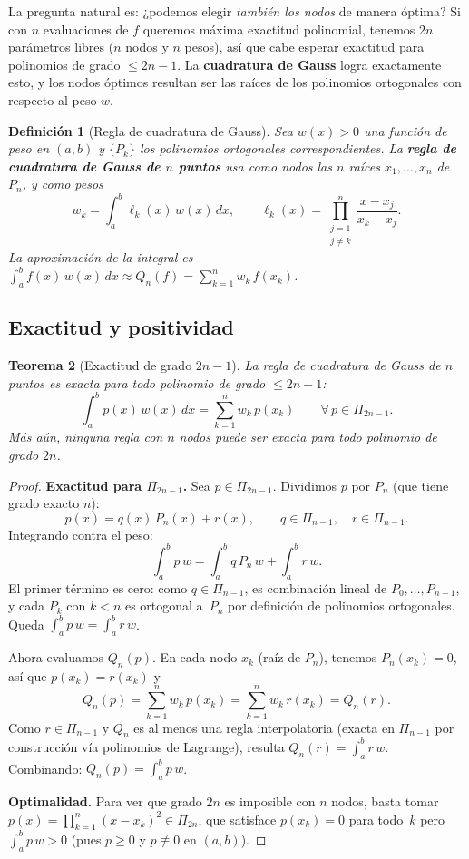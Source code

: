 \documentclass[a4paper,11pt]{report}
\newtheorem{theorem}{Teorema}[chapter]
\newtheorem{definition}[theorem]{Definición}
\begin{document}
La pregunta natural es: ¿podemos elegir \emph{también los nodos} de manera óptima?  Si con $n$ evaluaciones de $f$ queremos máxima exactitud polinomial, tenemos $2n$ parámetros libres ($n$ nodos y $n$ pesos), así que cabe esperar exactitud para polinomios de grado $\leq 2n - 1$.  La \textbf{cuadratura de Gauss} logra exactamente esto, y los nodos óptimos resultan ser las raíces de los polinomios ortogonales con respecto al peso $w$.

\begin{definition}[Regla de cuadratura de Gauss]
Sea $w(x) > 0$ una función de peso en $(a,b)$ y $\{P_k\}$ los polinomios ortogonales correspondientes.  La \textbf{regla de cuadratura de Gauss de $n$ puntos} usa como nodos las $n$ raíces $x_1, \ldots, x_n$ de $P_n$, y como pesos
\[
w_k = \int_a^b \ell_k(x)\,w(x)\,dx, \qquad \ell_k(x) = \prod_{\substack{j=1\\j\neq k}}^n \frac{x - x_j}{x_k - x_j}.
\]
La aproximación de la integral es $\int_a^b f(x)\,w(x)\,dx \approx Q_n(f) = \sum_{k=1}^n w_k\,f(x_k)$.
\end{definition}

\subsection{Exactitud y positividad}

\begin{theorem}[Exactitud de grado $2n{-}1$]\label{thm:exactitud_gauss}
La regla de cuadratura de Gauss de $n$ puntos es exacta para todo polinomio de grado $\leq 2n - 1$:
\[
\int_a^b p(x)\,w(x)\,dx = \sum_{k=1}^n w_k\,p(x_k) \qquad \forall\, p \in \Pi_{2n-1}.
\]
Más aún, ninguna regla con $n$ nodos puede ser exacta para todo polinomio de grado $2n$.
\end{theorem}

\begin{proof}
\textbf{Exactitud para $\Pi_{2n-1}$.}\; Sea $p \in \Pi_{2n-1}$.  Dividimos $p$ por $P_n$ (que tiene grado exacto $n$):
\[
p(x) = q(x)\,P_n(x) + r(x), \qquad q \in \Pi_{n-1},\quad r \in \Pi_{n-1}.
\]
Integrando contra el peso:
\[
\int_a^b p\,w = \int_a^b q\,P_n\,w + \int_a^b r\,w.
\]
El primer término es cero: como $q \in \Pi_{n-1}$, es combinación lineal de $P_0, \ldots, P_{n-1}$, y cada $P_k$ con $k < n$ es ortogonal a~$P_n$ por definición de polinomios ortogonales.  Queda $\int_a^b p\,w = \int_a^b r\,w$.

Ahora evaluamos $Q_n(p)$.  En cada nodo $x_k$ (raíz de $P_n$), tenemos $P_n(x_k) = 0$, así que $p(x_k) = r(x_k)$ y
\[
Q_n(p) = \sum_{k=1}^n w_k\,p(x_k) = \sum_{k=1}^n w_k\,r(x_k) = Q_n(r).
\]
Como $r \in \Pi_{n-1}$ y $Q_n$ es al menos una regla interpolatoria (exacta en $\Pi_{n-1}$ por construcción vía polinomios de Lagrange), resulta $Q_n(r) = \int_a^b r\,w$.  Combinando: $Q_n(p) = \int_a^b p\,w$.

\medskip
\textbf{Optimalidad.}\; Para ver que grado $2n$ es imposible con $n$ nodos, basta tomar $p(x) = \prod_{k=1}^n (x - x_k)^2 \in \Pi_{2n}$, que satisface $p(x_k) = 0$ para todo~$k$ pero $\int_a^b p\,w > 0$ (pues $p \geq 0$ y $p \not\equiv 0$ en $(a,b)$).
\end{proof}
\end{document}
